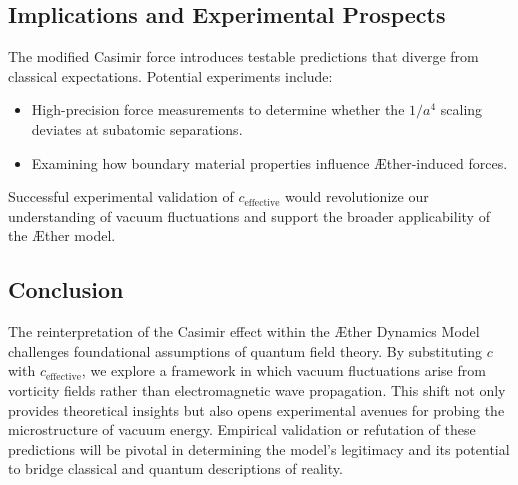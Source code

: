     \subsection*{Implications and Experimental Prospects}
    The modified Casimir force introduces testable predictions that diverge from classical expectations. Potential experiments include:
    \begin{itemize}
        \item High-precision force measurements to determine whether the $1/a^4$ scaling deviates at subatomic separations.
        \item Examining how boundary material properties influence Æther-induced forces.
    \end{itemize}
    Successful experimental validation of $c_{\text{effective}}$ would revolutionize our understanding of vacuum fluctuations and support the broader applicability of the Æther model.

    \subsection*{Conclusion}
    The reinterpretation of the Casimir effect within the Æther Dynamics Model challenges foundational assumptions of quantum field theory. By substituting $c$ with $c_{\text{effective}}$, we explore a framework in which vacuum fluctuations arise from vorticity fields rather than electromagnetic wave propagation. This shift not only provides theoretical insights but also opens experimental avenues for probing the microstructure of vacuum energy. Empirical validation or refutation of these predictions will be pivotal in determining the model's legitimacy and its potential to bridge classical and quantum descriptions of reality.

